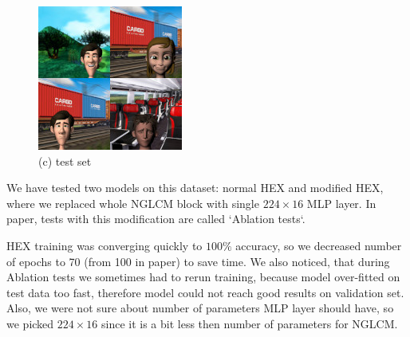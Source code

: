 \documentclass{article} %
\begin{document}
\begin{figure}[h]
    \includegraphics[width=\textwidth]{res/test.jpg}
    \caption*{(c) test set}
    \endminipage\hfill
\end{figure}

We have tested two models on this dataset: normal HEX and modified HEX, where we replaced whole NGLCM block with single 
$224\times16$ MLP layer. In paper, tests with this modification are called `Ablation tests`.

HEX training was converging quickly to $100\%$ accuracy, so we decreased number of epochs to 70 (from 100 in paper) to save time.
We also noticed, that during Ablation tests we sometimes had to rerun training, because model over-fitted on test
data too fast, therefore model could not reach good results on validation set. Also, we were not sure about number of parameters MLP layer should have,
so we picked $224\times16$ since it is a bit less then number of parameters for NGLCM.
\end{document}
